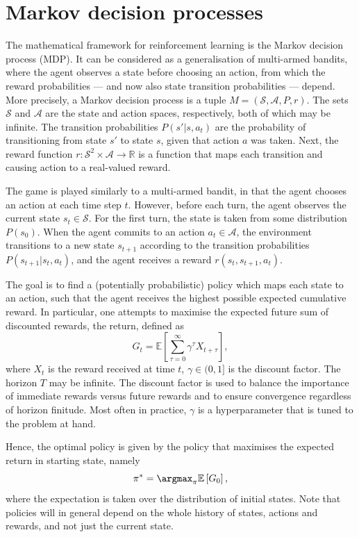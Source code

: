 \section{Markov decision processes}
The mathematical framework for reinforcement learning is the Markov decision process (MDP).
It can be considered as a generalisation of multi-armed bandits, where the agent observes a state before choosing an action, from which the reward probabilities — and now also state transition probabilities — depend.
More precisely, a Markov decision process is a tuple $M = (\mathcal{S}, \mathcal{A}, P, r)$.
The sets $\mathcal{S}$ and $\mathcal{A}$ are the state and action spaces, respectively, both of which may be infinite.
The transition probabilities $P(s' | s, a_t)$ are the probability of transitioning from state $s'$ to state $s$, given that action $a$ was taken.
Next, the reward function $r : \mathcal{S}^2 \times \mathcal{A} \to \mathbb{R}$ is a function that maps each transition and causing action to a real-valued reward.

The game is played similarly to a multi-armed bandit, in that the agent chooses an action at each time step $t$.
However, before each turn, the agent observes the current state $s_t \in \mathcal{S}$.
For the first turn, the state is taken from some distribution $P(s_0)$.
When the agent commits to an action $a_t \in \mathcal{A}$, the environment transitions to a new state $s_{t+1}$ according to the transition probabilities $P(s_{t+1} | s_t, a_t)$, and the agent receives a reward $r(s_t, s_{t+1}, a_t)$.

The goal is to find a (potentially probabilistic) policy which maps each state to an action, such that the agent receives the highest possible expected cumulative reward.
In particular, one attempts to maximise the expected future sum of discounted rewards, the return, defined as
\begin{equation}
    G_t = \mathbb{E} \left[ \sum_{\tau=0}^{\infty} \gamma^\tau X_{t+\tau} \right],
\end{equation}
where $X_t$ is the reward received at time $t$, $\gamma \in (0,1]$ is the discount factor.
The horizon $T$ may be infinite.
The discount factor is used to balance the importance of immediate rewards versus future rewards and to ensure convergence regardless of horizon finitude.
Most often in practice, $\gamma$ is a hyperparameter that is tuned to the problem at hand.

Hence, the optimal policy is given by the policy that maximises the expected return in starting state, namely
\begin{equation}
    \pi^* = \argmax_{\pi} \mathbb{E} \left[ G_0 \right],
\end{equation}
where the expectation is taken over the distribution of initial states.
Note that policies will in general depend on the whole history of states, actions and rewards, and not just the current state.

